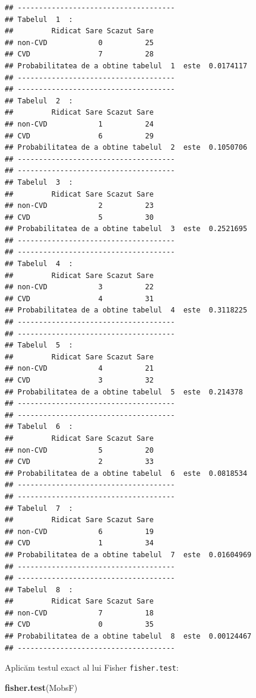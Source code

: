 \documentclass[]{article}
\newenvironment{Shaded}{\begin{snugshade}}{\end{snugshade}}
\newcommand{\KeywordTok}[1]{\textcolor[rgb]{0.13,0.29,0.53}{\textbf{{#1}}}}
\newcommand{\NormalTok}[1]{{#1}}
\begin{document}
\begin{verbatim}
## -------------------------------------
## Tabelul  1  :
##         Ridicat Sare Scazut Sare
## non-CVD            0          25
## CVD                7          28
## Probabilitatea de a obtine tabelul  1  este  0.0174117 
## -------------------------------------
## -------------------------------------
## Tabelul  2  :
##         Ridicat Sare Scazut Sare
## non-CVD            1          24
## CVD                6          29
## Probabilitatea de a obtine tabelul  2  este  0.1050706 
## -------------------------------------
## -------------------------------------
## Tabelul  3  :
##         Ridicat Sare Scazut Sare
## non-CVD            2          23
## CVD                5          30
## Probabilitatea de a obtine tabelul  3  este  0.2521695 
## -------------------------------------
## -------------------------------------
## Tabelul  4  :
##         Ridicat Sare Scazut Sare
## non-CVD            3          22
## CVD                4          31
## Probabilitatea de a obtine tabelul  4  este  0.3118225 
## -------------------------------------
## -------------------------------------
## Tabelul  5  :
##         Ridicat Sare Scazut Sare
## non-CVD            4          21
## CVD                3          32
## Probabilitatea de a obtine tabelul  5  este  0.214378 
## -------------------------------------
## -------------------------------------
## Tabelul  6  :
##         Ridicat Sare Scazut Sare
## non-CVD            5          20
## CVD                2          33
## Probabilitatea de a obtine tabelul  6  este  0.0818534 
## -------------------------------------
## -------------------------------------
## Tabelul  7  :
##         Ridicat Sare Scazut Sare
## non-CVD            6          19
## CVD                1          34
## Probabilitatea de a obtine tabelul  7  este  0.01604969 
## -------------------------------------
## -------------------------------------
## Tabelul  8  :
##         Ridicat Sare Scazut Sare
## non-CVD            7          18
## CVD                0          35
## Probabilitatea de a obtine tabelul  8  este  0.00124467 
## -------------------------------------
\end{verbatim}

Aplicăm testul exact al lui Fisher \texttt{fisher.test}:

\begin{Shaded}
\begin{Highlighting}[]
\KeywordTok{fisher.test}\NormalTok{(MobsF)}
\end{Highlighting}
\end{Shaded}
\end{document}
